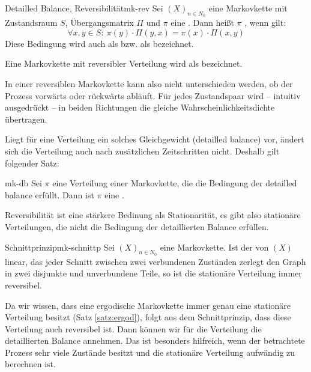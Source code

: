 \begin{definition}{Detailled Balance, Reversibilität}{mk-rev}
Sei $(X)_{n\in N_0}$ eine Markovkette mit Zustandsraum $S$, Übergangsmatrix
$\Pi$ und $\pi$ eine . Dann heißt $\pi$
, wenn gilt:
\[
\forall x,y\in S:\ \pi(y)\cdot\Pi(y,x) = \pi(x)\cdot\Pi(x,y)
\]
Diese Bedingung wird auch als  bzw. als
 bezeichnet.

Eine Markovkette mit reversibler Verteilung wird als 
bezeichnet.
\end{definition}

In einer reversiblen Markovkette kann also nicht unterschieden werden, ob der
Prozess vorwärts oder rückwärts abläuft. Für jedes
Zustandspaar wird – intuitiv ausgedrückt – in beiden Richtungen die gleiche
Wahrscheinlichkeitsdichte übertragen.

Liegt für eine Verteilung ein solches Gleichgewicht (detailled balance) vor,
ändert sich die Verteilung auch nach zusätzlichen Zeitschritten nicht.
Deshalb gilt folgender Satz:

\begin{theorem}{}{mk-db}
Sei $\pi$ eine Verteilung einer Markovkette, die die Bedingung der
detailled balance erfüllt. Dann ist $\pi$ eine
.
\end{theorem}

Reversibilität ist eine stärkere Bedinung als Stationarität, es gibt also
stationäre Verteilungen, die nicht die Bedingung der detaillierten Balance
erfüllen.

\begin{theorem}{Schnittprinzip}{mk-schnittp}
Sei $(X)_{n\in N_0}$ eine  Markovkette. Ist der
 von $(X)$ linear, das jeder Schnitt
zwischen zwei verbundenen Zuständen zerlegt den Graph in zwei disjunkte und
unverbundene Teile, so ist die stationäre Verteilung immer reversibel.
\end{theorem}

Da wir wissen, dass eine ergodische Markovkette immer genau eine stationäre
Verteilung besitzt (Satz \ref{satz:ergod}), folgt aus dem Schnittprinzip, dass
diese Verteilung auch reversibel ist. Dann können wir für die Verteilung die
detaillierten Balance annehmen. Das ist besonders hilfreich, wenn der
betrachtete Prozess sehr viele Zustände besitzt und die stationäre Verteilung
aufwändig zu berechnen ist.


